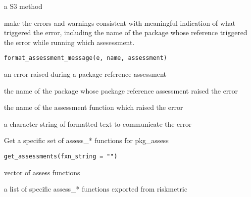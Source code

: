 \documentclass[a4paper]{book}
\begin{document}
%
\begin{Value}
a S3 method
\end{Value}
%
\begin{Description}
make the errors and warnings consistent with meaningful indication of what
triggered the error, including the name of the package whose reference
triggered the error while running which asesessment.
\end{Description}
%
\begin{Usage}
\begin{verbatim}
format_assessment_message(e, name, assessment)
\end{verbatim}
\end{Usage}
%
\begin{Arguments}
\begin{ldescription}
\item[\code{e}] an error raised during a package reference assessment

\item[\code{name}] the name of the package whose package reference assessment raised
the error

\item[\code{assessment}] the name of the assessment function which raised the error
\end{ldescription}
\end{Arguments}
%
\begin{Value}
a character string of formatted text to communicate the error
\end{Value}
%
\begin{Description}
Get a specific set of assess\_* functions for pkg\_assess
\end{Description}
%
\begin{Usage}
\begin{verbatim}
get_assessments(fxn_string = "")
\end{verbatim}
\end{Usage}
%
\begin{Arguments}
\begin{ldescription}
\item[\code{fxn\_string}] vector of assess functions
\end{ldescription}
\end{Arguments}
%
\begin{Value}
a list of specific assess\_* functions exported from riskmetric
\end{Value}
\end{document}
